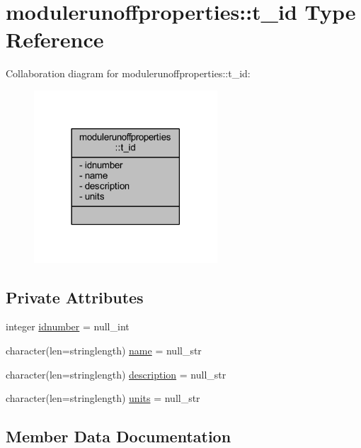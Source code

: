 \hypertarget{structmodulerunoffproperties_1_1t__id}{}\section{modulerunoffproperties\+:\+:t\+\_\+id Type Reference}
\label{structmodulerunoffproperties_1_1t__id}


Collaboration diagram for modulerunoffproperties\+:\+:t\+\_\+id\+:\nopagebreak
\begin{figure}[H]
\begin{center}
\leavevmode
\includegraphics[width=194pt]{structmodulerunoffproperties_1_1t__id__coll__graph}
\end{center}
\end{figure}
\subsection*{Private Attributes}
\begin{DoxyCompactItemize}
\item 
integer \mbox{\hyperlink{structmodulerunoffproperties_1_1t__id_a7f927d1e72a7dcd9b24ee265d9cc7097}{idnumber}} = null\+\_\+int
\item 
character(len=stringlength) \mbox{\hyperlink{structmodulerunoffproperties_1_1t__id_a435deca38e9ca27542b7b62d14c62af8}{name}} = null\+\_\+str
\item 
character(len=stringlength) \mbox{\hyperlink{structmodulerunoffproperties_1_1t__id_a70e65a7057428bc8f96004191558b89a}{description}} = null\+\_\+str
\item 
character(len=stringlength) \mbox{\hyperlink{structmodulerunoffproperties_1_1t__id_a3f98e0304ffc34376a7cd3013bb65292}{units}} = null\+\_\+str
\end{DoxyCompactItemize}


\subsection{Member Data Documentation}
\mbox{\label{structmodulerunoffproperties_1_1t__id_a70e65a7057428bc8f96004191558b89a}} 
